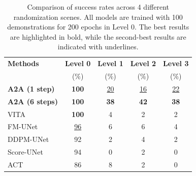 \documentclass[onecolumn]{fairmeta}
\newcommand{\m}[1]{{A2A}}
\begin{document}
	
	\begin{table}[ht]
		\caption{Comparison of success rates across 4 different randomization scenes. All models are trained with 100 demonstrations for 200 epochs in Level 0. The best results are highlighted in {bold}, while the second-best results are indicated with {underlines}.}
		\label{tab-generalization}
		\centering
		\small
		\setlength{\tabcolsep}{3.5pt}
		\begin{tabular}{lcccc}
			\toprule
			\textbf{Methods} & \textbf{Level 0} & \textbf{Level 1} & \textbf{Level 2} & \textbf{Level 3} \\
			& (\%) & (\%) & (\%) & (\%) \\
			\midrule
			\textbf{\m{} (1 step)} & \textbf{100} & \underline{20} & \underline{16} & \underline{22} \\
			\textbf{\m{} (6 steps)} & \textbf{100}  & \textbf{38} & \textbf{42} & \textbf{38} \\
			VITA                & \textbf{100}    & 4           & 2           & 2          \\
			FM-UNet             & \underline{96}  & 6           & 6           & 4          \\
			DDPM-UNet           & 92              & 2          & 4           & 2          \\
			Score-UNet          & 94              & 0          & 2           & 0          \\
			ACT                 & 86              & 8          & 2           & 0          \\
			\bottomrule
		\end{tabular}
	\end{table}
	
\end{document}
